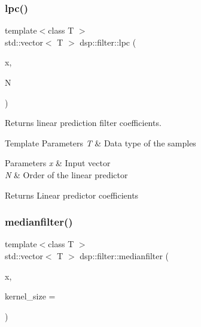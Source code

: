 \subsubsection{\texorpdfstring{lpc()}{lpc()}}
{\footnotesize\ttfamily template$<$class T $>$ \\
std\+::vector$<$ T $>$ dsp\+::filter\+::lpc (\begin{DoxyParamCaption}\item[{const std\+::vector$<$ T $>$ \&}]{x,  }\item[{unsigned}]{N }\end{DoxyParamCaption})}



Returns linear prediction filter coefficients. 


\begin{DoxyTemplParams}{Template Parameters}
{\em T} & Data type of the samples \\
\hline
\end{DoxyTemplParams}

\begin{DoxyParams}{Parameters}
{\em x} & Input vector \\
\hline
{\em N} & Order of the linear predictor \\
\hline
\end{DoxyParams}
\begin{DoxyReturn}{Returns}
Linear predictor coefficients 
\end{DoxyReturn}
\mbox{\label{namespacedsp_1_1filter_abb22b1c3577694682a3ee2915478f83b}} 
\subsubsection{\texorpdfstring{medianfilter()}{medianfilter()}\hspace{0.1cm}{\footnotesize\ttfamily [1/2]}}
{\footnotesize\ttfamily template$<$class T $>$ \\
std\+::vector$<$ T $>$ dsp\+::filter\+::medianfilter (\begin{DoxyParamCaption}\item[{const std\+::vector$<$ T $>$ \&}]{x,  }\item[{size\+\_\+t}]{kernel\+\_\+size = {} }\end{DoxyParamCaption})}



